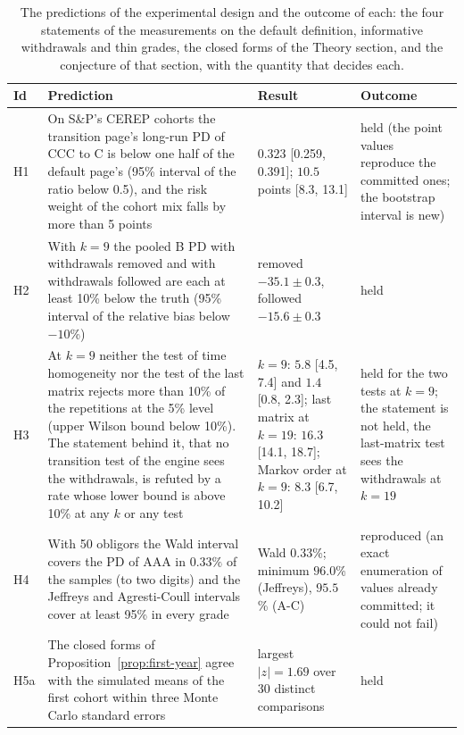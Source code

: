 \begin{table}[htbp]
\centering
\setlength{\tabcolsep}{3.5pt}
\footnotesize
\caption{The predictions of the experimental design and the outcome of each: the four statements of the measurements on the default definition, informative withdrawals and thin grades, the closed forms of the Theory section, and the conjecture of that section, with the quantity that decides each.}
\label{tab:outcomes}
\begin{tabular}{lp{5.2cm}p{4.2cm}p{2.6cm}}
\toprule
Id & Prediction & Result & Outcome \\
\midrule
\relax H1 & \relax On S\&P's CEREP cohorts the transition page's long-run PD of CCC to C is below one half of the default page's (95\% interval of the ratio below 0.5), and the risk weight of the cohort mix falls by more than 5 points & $0.323$ [0.259, 0.391]; $10.5$ points [8.3, 13.1] & \relax held (the point values reproduce the committed ones; the bootstrap interval is new) \\
\relax H2 & \relax With $k=9$ the pooled B PD with withdrawals removed and with withdrawals followed are each at least 10\% below the truth (95\% interval of the relative bias below $-10$\%) & \relax removed $-35.1\pm0.3$, followed $-15.6\pm0.3$ & \relax held \\
\relax H3 & \relax At $k=9$ neither the test of time homogeneity nor the test of the last matrix rejects more than 10\% of the repetitions at the 5\% level (upper Wilson bound below 10\%). The statement behind it, that no transition test of the engine sees the withdrawals, is refuted by a rate whose lower bound is above 10\% at any $k$ or any test & $k=9$: $5.8$ [4.5, 7.4] and $1.4$ [0.8, 2.3]; last matrix at $k=19$: $16.3$ [14.1, 18.7]; Markov order at $k=9$: $8.3$ [6.7, 10.2] & \relax held for the two tests at $k=9$; the statement is not held, the last-matrix test sees the withdrawals at $k=19$ \\
\relax H4 & \relax With 50 obligors the Wald interval covers the PD of AAA in $0.33\%$ of the samples (to two digits) and the Jeffreys and Agresti-Coull intervals cover at least 95\% in every grade & \relax Wald $0.33$\%; minimum $96.0$\% (Jeffreys), $95.5$\% (A-C) & \relax reproduced (an exact enumeration of values already committed; it could not fail) \\
\relax H5a & \relax The closed forms of Proposition~\ref{prop:first-year} agree with the simulated means of the first cohort within three Monte Carlo standard errors & \relax largest $|z|=1.69$ over 30 distinct comparisons & \relax held \\

\end{tabular}
\end{table}
